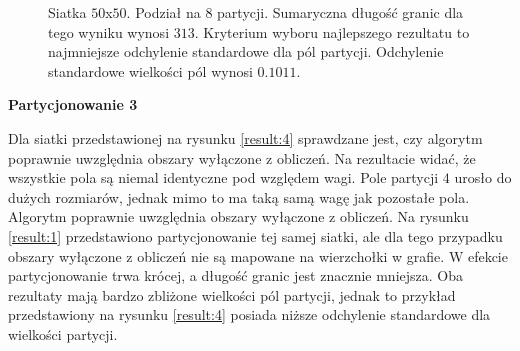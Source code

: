 \begin{figure}[h]
\begin{subfigure}{.33\textwidth}
    \caption[short]{}
\end{subfigure}
\caption{Siatka $50$x$50$. Podział na $8$ partycji. Sumaryczna długość granic dla tego wyniku wynosi $313$.
Kryterium wyboru najlepszego rezultatu to najmniejsze odchylenie standardowe dla pól partycji.
Odchylenie standardowe wielkości pól wynosi $0.1011$.}
\label{result:3}
\end{figure}

\vspace{3mm}
\textbf{Partycjonowanie 3}
\vspace{1mm}

Dla siatki przedstawionej na rysunku \ref{result:4} sprawdzane jest, czy algorytm poprawnie uwzględnia obszary wyłączone z obliczeń.
Na rezultacie widać, że wszystkie pola są niemal identyczne pod względem wagi.
Pole partycji $4$ urosło do dużych rozmiarów, jednak mimo to ma taką samą wagę jak pozostałe pola.
Algorytm poprawnie uwzględnia obszary wyłączone z obliczeń.
Na rysunku \ref{result:1} przedstawiono partycjonowanie tej samej siatki, ale dla tego przypadku obszary wyłączone
z obliczeń nie są mapowane na wierzchołki w grafie.
W efekcie partycjonowanie trwa krócej, a długość granic jest znacznie mniejsza.
Oba rezultaty mają bardzo zbliżone wielkości pól partycji, jednak to przykład przedstawiony na rysunku \ref{result:4} posiada niższe
odchylenie standardowe dla wielkości partycji.

